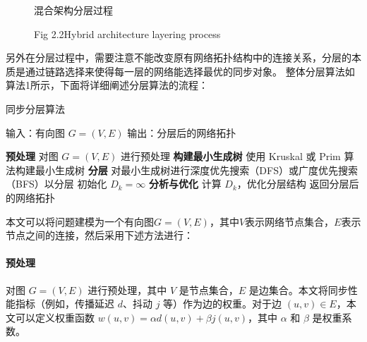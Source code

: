 \documentclass[UTF8,a4paper,12pt]{ctexart}
\numberwithin{equation}{section}
\begin{document}
	\begin{figure}[htb]
		\caption{混合架构分层过程}
		\vspace{-10pt}
		\caption*{Fig 2.2\quad Hybrid architecture layering process}
	\end{figure}
	
	另外在分层过程中，需要注意不能改变原有网络拓扑结构中的连接关系，分层的本质是通过链路选择来使得每一层的网络能选择最优的同步对象。
	整体分层算法如算法1所示，下面将详细阐述分层算法的流程：
	\begin{algorithm}
		\caption{同步分层算法}
		\begin{algorithmic}[1]
			\STATE 输入：有向图 $G=(V, E)$
			\STATE 输出：分层后的网络拓扑
			
			\STATE \textbf{预处理} 对图 $G=(V, E)$ 进行预处理
			\STATE \textbf{构建最小生成树} 使用 Kruskal 或 Prim 算法构建最小生成树
			\STATE \textbf{分层} 对最小生成树进行深度优先搜索（DFS）或广度优先搜索（BFS）以分层
			\STATE 初始化 $D_k = \infty$
			\STATE \textbf{分析与优化} 计算 $D_k$，优化分层结构
			\ENDWHILE
			\STATE 返回分层后的网络拓扑
		\end{algorithmic}
	\end{algorithm}
	
	本文可以将问题建模为一个有向图$G=(V, E)$，其中$V$表示网络节点集合，$E$表示节点之间的连接，然后采用下述方法进行：
	\paragraph{预处理}对图 $G=(V,E)$ 进行预处理，其中 $V$ 是节点集合，$E$ 是边集合。本文将同步性能指标（例如，传播延迟 $d$、抖动 $j$ 等）作为边的权重。对于边 $(u, v) \in E$，本文可以定义权重函数 $w(u, v) = \alpha d(u, v) + \beta j(u, v)$，其中 $\alpha$ 和 $\beta$ 是权重系数。
	
\end{document}
